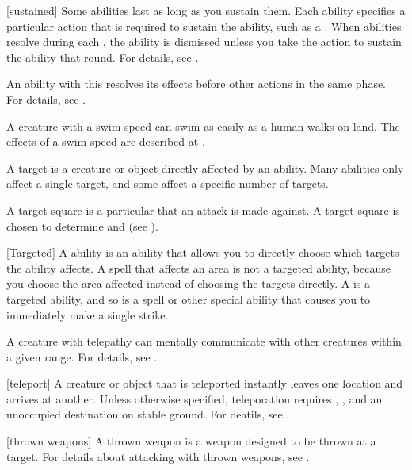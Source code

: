 [sustained] Some abilities last as long as you sustain them.
Each ability specifies a particular action that is required to sustain the ability, such as a .
When  abilities resolve during each , the ability is dismissed unless you take the action to sustain the ability that round.
For details, see .

 An ability with this  resolves its effects before other actions in the same phase.
For details, see .

 A creature with a swim speed can swim as easily as a human walks on land.
The effects of a swim speed are described at .

 A target is a creature or object directly affected by an ability.
Many abilities only affect a single target, and some affect a specific number of targets.

 A target square is a particular  that an attack is made against.
A target square is chosen to determine  and  (see ).

[Targeted] A  ability is an ability that allows you to directly choose which targets the ability affects.
A spell that affects an area is not a targeted ability, because you choose the area affected instead of choosing the targets directly.
A  is a targeted ability, and so is a spell or other special ability that causes you to immediately make a single strike.

 A creature with telepathy can mentally communicate with other creatures within a given range.
For details, see .

[teleport] A creature or object that is teleported instantly leaves one location and arrives at another.
Unless otherwise specified, teleporation requires , , and an unoccupied destination on stable ground.
For deatils, see .

[thrown weapons] A thrown weapon is a weapon designed to be thrown at a target.
For details about attacking with thrown weapons, see .

